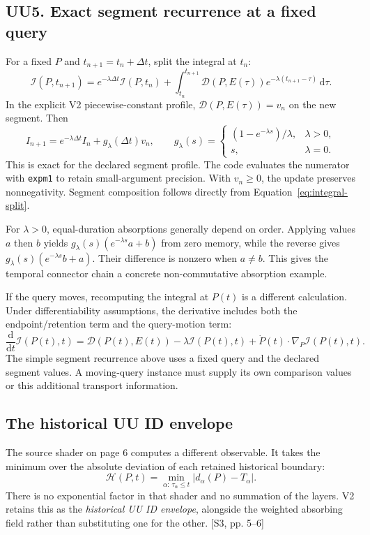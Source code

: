 \documentclass[11pt,a4paper]{article}
\numberwithin{equation}{section}
\newcommand{\src}[2]{{\sffamily\small\color{slate}[#1, #2]}}
\newcommand{\dd}{\mathrm d}
\begin{document}
\subsection{UU5. Exact segment recurrence at a fixed query}
For a fixed $P$ and $t_{n+1}=t_n+\Delta t$, split the integral at $t_n$:
\begin{equation}
\mathcal I(P,t_{n+1})=e^{-\lambda\Delta t}\mathcal I(P,t_n)
+\int_{t_n}^{t_{n+1}}\mathcal D(P,E(\tau))e^{-\lambda(t_{n+1}-\tau)}\,\dd\tau.
\label{eq:integral-split}
\end{equation}
In the explicit V2 piecewise-constant profile, $\mathcal D(P,E(\tau))=v_n$ on the new segment. Then
\begin{equation}
I_{n+1}=e^{-\lambda\Delta t}I_n+g_\lambda(\Delta t)v_n,
\qquad
 g_\lambda(s)=\begin{cases}
(1-e^{-\lambda s})/\lambda,&\lambda>0,\\
s,&\lambda=0.
\end{cases}
\label{eq:integral-update}
\end{equation}
This is exact for the declared segment profile. The code evaluates the numerator with \texttt{expm1} to retain small-argument precision. With $v_n\ge0$, the update preserves nonnegativity. Segment composition follows directly from Equation~\eqref{eq:integral-split}.

For $\lambda>0$, equal-duration absorptions generally depend on order. Applying values $a$ then $b$ yields $g_\lambda(s)(e^{-\lambda s}a+b)$ from zero memory, while the reverse gives $g_\lambda(s)(e^{-\lambda s}b+a)$. Their difference is nonzero when $a\ne b$. This gives the temporal connector chain a concrete non-commutative absorption example.

If the query moves, recomputing the integral at $P(t)$ is a different calculation. Under differentiability assumptions, the derivative includes both the endpoint/retention term and the query-motion term:
\begin{equation}
\frac{\dd}{\dd t}\mathcal I(P(t),t)
=\mathcal D(P(t),E(t))-\lambda\mathcal I(P(t),t)
+\dot P(t)\cdot\nabla_P\mathcal I(P(t),t).
\end{equation}
The simple segment recurrence above uses a fixed query and the declared segment values. A moving-query instance must supply its own comparison values or this additional transport information.

\subsection{The historical UU ID envelope}
The source shader on page 6 computes a different observable. It takes the minimum over the absolute deviation of each retained historical boundary:
\begin{equation}
\mathcal H(P,t)=\min_{\alpha:\,\tau_\alpha\le t}
\left|d_\alpha(P)-T_\alpha\right|.
\label{eq:history-envelope}
\end{equation}
There is no exponential factor in that shader and no summation of the layers. V2 retains this as the \emph{historical UU ID envelope}, alongside the weighted absorbing field rather than substituting one for the other. \src{S3}{pp. 5--6}
\end{document}

